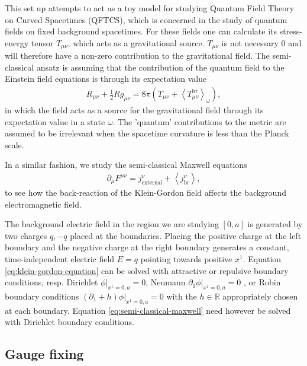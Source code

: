 This set up attempts to act as a toy model for studying Quantum Field Theory on Curved Spacetimes (QFTCS), which is concerned in the study of quantum fields on fixed background spacetimes. For these fields one can calculate its stress-energy tensor $T_{\mu\nu}$, which acts as a gravitational source.  $T_{\mu\nu}$ is not necessary 0 and will therefore have a non-zero contribution to the gravitational field. The semi-classical ansatz is assuming that the contribution of the quantum field to the Einstein field equations is through its expectation value
\begin{align}
R_{\mu\nu} + \frac{1}{2}Rg_{\mu\nu} = 8\pi \left( T_{\mu\nu} + \left<T_{\mu\nu}^\text{br} \right>_\omega \right),
\end{align}
in which the field acts as a source for the gravitational field through its expectation value in a state $\omega$. The 'quantum' contributions to the metric are assumed to be irrelevant when the spacetime curvature is less than the Planck scale.

In a similar fashion, we study the semi-classical Maxwell equations 
\begin{align}
			\partial_\mu F^{\mu\nu}= j_{\text{external}}^{\nu} + \left<j_\text{br}^{\nu} \right>,
			\label{eq:semi-classical-maxwell}
\end{align}
to see how the back-reaction of the Klein-Gordon field affects the background electromagnetic field. 

The background electric field in the region we are studying $[0, a]$ is generated by two charges $q, -q$ placed at the boundaries. Placing the positive charge at the left boundary and the negative charge at the right boundary generates a constant, time-independent electric field $E=q$ pointing towards positive $x^{1}$.
Equation \eqref{eq:klein-gordon-equation} can be solved with attractive or repulsive boundary conditions, resp. Dirichlet $\left. \phi\right|_{x^1 = 0, a}=0$, Neumann $\left. \partial_{1}\phi\right|_{x^1 = 0, a}=0$ , or Robin boundary conditions $\left.\left( \partial_1 + h\right)\phi  \right|_{x^{1}=0, a}=0$ with the $h\in \mathbb{R}$ appropriately chosen at each boundary. Equation \eqref{eq:semi-classical-maxwell} need however be solved with Dirichlet boundary conditions.

\subsection{Gauge fixing}

